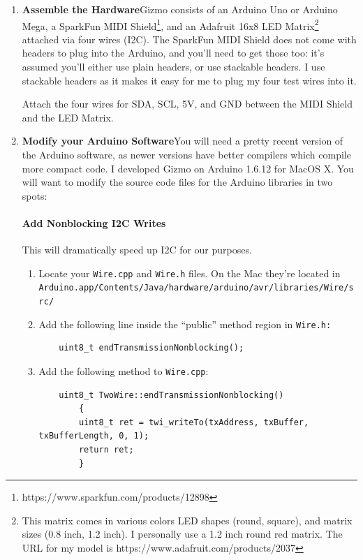 \documentclass{article}
\begin{document}
\begin{enumerate}

\item {\bf Assemble the Hardware}\quad Gizmo consists of an Arduino Uno or Arduino Mega, a SparkFun MIDI Shield\footnote{https:/\!/www.sparkfun.com/products/12898}, and an Adafruit 16x8 LED Matrix\footnote{This matrix comes in various colors LED shapes (round, square), and matrix sizes (0.8 inch, 1.2 inch).  I personally use a 1.2 inch round red matrix.  The URL for my model is https:/\!/www.adafruit.com/products/2037} attached via four wires (I2C).  The SparkFun MIDI Shield does not come with headers to plug into the Arduino, and you'll need to get those too: it's assumed you'll either use plain headers, or use stackable headers.  I use stackable headers as it makes it easy for me to plug my four test wires into it.

Attach the four wires for SDA, SCL, 5V, and GND between the MIDI Shield and the LED Matrix.  

\item {\bf Modify your Arduino Software}\quad You will need a pretty recent version of the Arduino software, as newer versions have better compilers which compile more compact code.  I developed Gizmo on Arduino 1.6.12 for MacOS X.  You will want to modify the source code files for the Arduino libraries in two spots:

\paragraph{Add Nonblocking I2C Writes}  This will dramatically speed up I2C for our purposes.
\begin{enumerate}
\item Locate your \texttt{Wire.cpp} and \texttt{Wire.h} files.  On the Mac they're located in\\\texttt{Arduino.app/Contents/Java/hardware/arduino/avr/libraries/Wire/src/}

\item Add the following line inside the ``public'' method region in \texttt{Wire.h:}

\begin{verbatim}
    uint8_t endTransmissionNonblocking();
\end{verbatim}

\item Add the following method to \texttt{Wire.cpp}:

\begin{verbatim}
    uint8_t TwoWire::endTransmissionNonblocking()
        {
        uint8_t ret = twi_writeTo(txAddress, txBuffer, txBufferLength, 0, 1);
        return ret;
        }
\end{verbatim}
\end{enumerate}


\end{enumerate}
\end{document}

